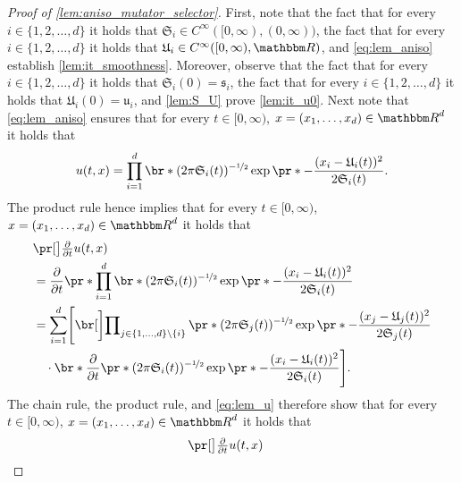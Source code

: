 \begin{proof}[Proof of \cref{lem:aniso_mutator_selector}]
	First, note that 
		the fact that 
			for every
				$i \in \{1,2,\dots,d\}$
			it holds that
				$\mathfrak{S}_i \in C^{\infty}([0,\infty),(0,\infty))$,
		the fact that 
			for every
				$i \in \{1,2,\dots,d\}$
			it holds that
				$\mathfrak{U}_i \in C^{\infty}([0,\infty),\R) $,
		and \eqref{eq:lem_aniso}
	establish 
		\cref{lem:it_smoothness}.
	Moreover, observe that 
		the fact that 
			for every
				$i \in \{1,2,\dots,d\}$
			it holds that
				$\mathfrak{S}_i(0) = \mathfrak{s}_i$,
		the fact that 
			for every
				$i \in \{1,2,\dots,d\}$
			it holds that
				$\mathfrak{U}_i(0) = \mathfrak{u}_i$,
		and	\eqref{lem:S_U}
	prove  
		\cref{lem:it_u0}.
	Next note that 
		\eqref{eq:lem_aniso} 
	ensures that 
		for every
			$t \in [0,\infty)$,
			$x = (x_1,\dots,x_d)\in \R^d$
		it holds that
		\begin{equation}\label{eq:lem_u}
			u(t,x) 
			=
			\prod_{i=1}^d \br*{ (2\pi \mathfrak{S}_i(t))^{-\nicefrac{1}{2}} \exp\pr*{ - \frac{(x_i -\mathfrak{U}_i(t) )^2}{2\mathfrak{S}_i(t)}} }
			.
		\end{equation}
		The product rule 
		hence 
	implies that 
		for every
			$t \in [0,\infty)$,
			$x = (x_1,\dots,x_d)\in \R^d$
		it holds that
		\begin{equation}
		\begin{split}
			&
			\bpr{\tfrac{\partial }{\partial t}u} (t,x)  
			\\ & = 
			\frac{\partial}{\partial t} \pr*{\prod_{i=1}^d \br*{ (2\pi   \mathfrak{S}_i(t))^{-\nicefrac{1}{2}}  \exp \pr*{ - \frac{(x_i -\mathfrak{U}_i(t) )^2}{2\mathfrak{S}_i(t)}} } }
			\\ & = 
			\sum_{i=1}^d \Biggl[  \bbbbr{ \prod\nolimits_{ j \in \{ 1,\dots,d \} \backslash\{i\}} \pr*{ (2\pi \mathfrak{S}_j(t))^{-\nicefrac{1}{2}} \exp\pr*{ - \frac{(x_j -\mathfrak{U}_j(t) )^2}{2\mathfrak{S}_j(t)}} }}\\
			&\quad \cdot \br*{ \frac{\partial}{\partial t} \pr*{ (2\pi   \mathfrak{S}_i(t))^{-\nicefrac{1}{2}}   \exp\pr*{- \frac{(x_i -\mathfrak{U}_i(t) )^2}{2\mathfrak{S}_i(t)}} }  } \Biggr]
			.
		\end{split} 
		\end{equation}
		The chain rule,
		the product rule, 
		and \eqref{eq:lem_u} 
		therefore 
	show that 
		for every
			$t \in [0,\infty)$,
			$x = (x_1,\dots,x_d)\in \R^d$
		it holds that
		\begin{align}
			&\notag
			\bpr{\tfrac{\partial }{\partial t}u} (t,x)  

\end{align}
\end{proof}
